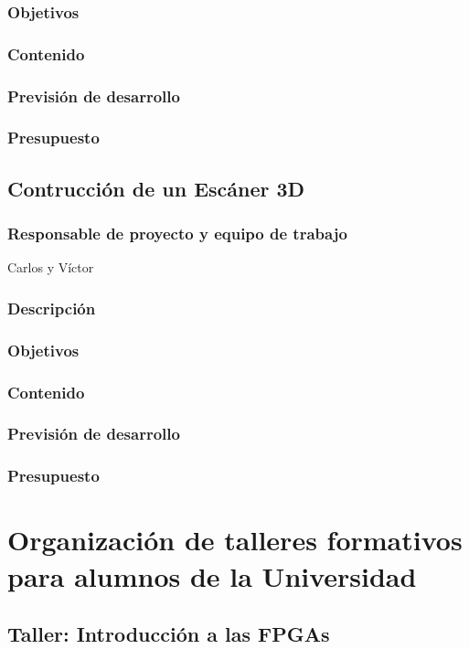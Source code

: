 \documentclass[12pt,twoside]{report}
\begin{document}
\subsubsection{Objetivos}
\subsubsection{Contenido}
\subsubsection{Previsión de desarrollo}
\subsubsection{Presupuesto}


\subsection{Contrucción de un Escáner 3D}
\subsubsection{Responsable de proyecto y equipo de trabajo}
Carlos y Víctor
\subsubsection{Descripción}
\subsubsection{Objetivos}
\subsubsection{Contenido}
\subsubsection{Previsión de desarrollo}
\subsubsection{Presupuesto}


\section{Organización de talleres formativos para alumnos de la Universidad}

\subsection{Taller: Introducción a las FPGAs}
\end{document}

